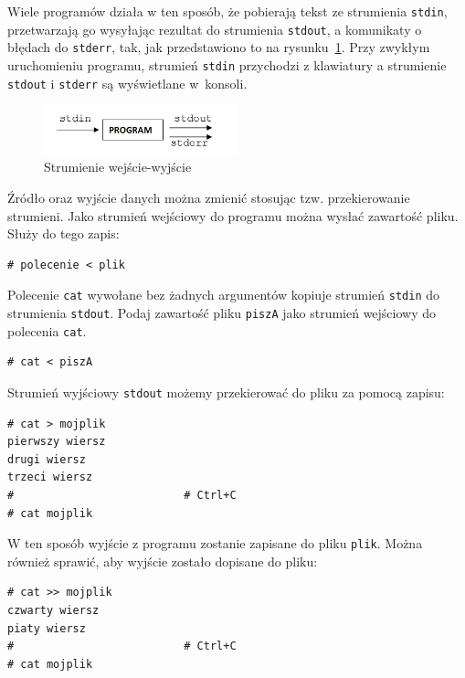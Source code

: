 Wiele programów działa w ten sposób, że pobierają tekst ze strumienia \lstinline[style=MyBashStyle]{stdin}, przetwarzają go wysyłając rezultat do strumienia \lstinline[style=MyBashStyle]{stdout}, a komunikaty o błędach do \lstinline[style=MyBashStyle]{stderr}, tak, jak przedstawiono to na rysunku~\ref{fig:strumienie}. Przy zwykłym uruchomieniu programu, strumień \lstinline[style=MyBashStyle]{stdin} przychodzi z klawiatury a strumienie \lstinline[style=MyBashStyle]{stdout} i \lstinline[style=MyBashStyle]{stderr} są wyświetlane w~konsoli.

\begin{figure}[!h]
\centering
\includegraphics[width=0.5\textwidth]{img/strumienie}
\caption{Strumienie wejście-wyjście}
\label{fig:strumienie}
\end{figure}

Źródło oraz wyjście danych można zmienić stosując tzw. przekierowanie strumieni. Jako strumień wejściowy do programu można wysłać zawartość pliku. Służy do tego zapis:

\begin{lstlisting}[style=MyBashStyle]
# polecenie < plik
\end{lstlisting}


\begin{example}

Polecenie \lstinline[style=MyBashStyle]{cat} wywołane bez żadnych argumentów kopiuje strumień \lstinline[style=MyBashStyle]{stdin} do strumienia \lstinline[style=MyBashStyle]{stdout}. Podaj zawartość pliku \lstinline[style=MyBashStyle]{piszA} jako strumień wejściowy do polecenia \lstinline[style=MyBashStyle]{cat}.

\begin{lstlisting}[style=MyBashStyle]
# cat < piszA
\end{lstlisting}

Strumień wyjściowy \lstinline[style=MyBashStyle]{stdout} możemy przekierować do pliku za pomocą zapisu:

\begin{lstlisting}[style=MyBashStyle]
# cat > mojplik
pierwszy wiersz
drugi wiersz
trzeci wiersz
#                          # Ctrl+C
# cat mojplik
\end{lstlisting}

W ten sposób wyjście z programu zostanie zapisane do pliku \lstinline[style=MyBashStyle]{plik}. Można również sprawić, aby wyjście zostało dopisane do pliku:

\begin{lstlisting}[style=MyBashStyle]
# cat >> mojplik
czwarty wiersz
piaty wiersz
#                          # Ctrl+C
# cat mojplik
\end{lstlisting}
\end{example}


